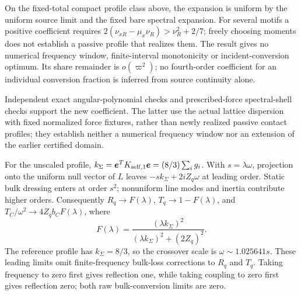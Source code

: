 \documentclass[10pt,aps,onecolumn,notitlepage,nofootinbib]{revtex4-2}
\begin{document}
On the fixed-total compact profile class above, the expansion is uniform
by the uniform source limit and the fixed bare spectral expansion.
For several motifs a positive coefficient requires
$2(\nu_{xR}-\mu_x\nu_R)>\nu_R^2+2/7$; freely choosing moments does
not establish a passive profile that realizes them. The result gives no
numerical frequency window, finite-interval monotonicity or
incident-conversion optimum. Its share remainder is $o(\varpi^2)$;
no fourth-order coefficient for an individual conversion fraction is
inferred from source continuity alone.

Independent exact angular-polynomial checks and prescribed-force spectral-shell checks support the new coefficient. The latter use the actual lattice dispersion with fixed normalized force fixtures, rather than newly realized passive contact profiles; they establish neither a numerical frequency window nor an extension of the earlier certified domain.

For the unscaled profile, $k_\Sigma=\bm e^TK_{{\rm self},1}\bm e=(8/3)\sum_i g_i$. With $s=\lambda\omega$, projection onto the uniform null vector of $L$ leaves $-s k_\Sigma+2iZ_q\omega$ at leading order. Static bulk dressing enters at order $s^2$; nonuniform line modes and inertia contribute higher orders. Consequently $R_q\to F(\lambda)$, $T_q\to1-F(\lambda)$, and $T_C/\omega^2\to4Z_qb_CF(\lambda)$, where
\begin{equation}
 F(\lambda)=\frac{(\lambda k_\Sigma)^2}{(\lambda k_\Sigma)^2+(2Z_q)^2}.
\end{equation}
The reference profile has $k_\Sigma=8/3$, so the crossover scale is $\omega\sim1.025641s$. These leading limits omit finite-frequency bulk-loss corrections to $R_q$ and $T_q$. Taking frequency to zero first gives reflection one, while taking coupling to zero first gives reflection zero; both raw bulk-conversion limits are zero.
\end{document}
